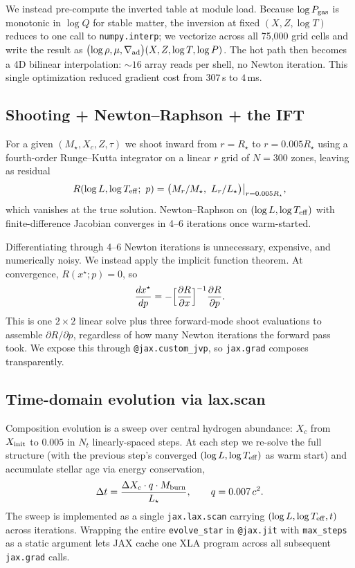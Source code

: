 \documentclass[twocolumn]{aastex631}
\newcommand{\Teff}{\ensuremath{T_{\rm eff}}}
\newcommand{\code}[1]{\texttt{#1}}
\begin{document}
We instead pre-compute the inverted table at module load. Because
$\log P_{\rm gas}$ is monotonic in $\log Q$ for stable matter, the
inversion at fixed $(X, Z, \log T)$ reduces to one call to
\code{numpy.interp}; we vectorize across all 75{,}000 grid cells and
write the result as
$\bigl(\log\rho, \mu, \nabla_{\rm ad}\bigr)(X, Z, \log T, \log P)$.
The hot path then becomes a 4D bilinear interpolation:
$\sim 16$ array reads per shell, no Newton iteration. This single
optimization reduced gradient cost from $307\,$s to $4\,$ms.

\subsection{Shooting + Newton--Raphson + the IFT}

For a given $(M_\star, X_c, Z, \tau)$ we shoot inward from
$r = R_\star$ to $r = 0.005 R_\star$ using a fourth-order Runge--Kutta
integrator on a linear $r$ grid of $N = 300$ zones, leaving as residual
\begin{equation}
R(\log L, \log\Teff;\ p) = \bigl(M_r/M_\star,\ L_r/L_\star\bigr)\big|_{r=0.005 R_\star},
\end{equation}
which vanishes at the true solution. Newton--Raphson on
$(\log L, \log\Teff)$ with finite-difference Jacobian converges in 4--6
iterations once warm-started.

Differentiating through 4--6 Newton iterations is unnecessary, expensive,
and numerically noisy. We instead apply the implicit function theorem.
At convergence, $R(x^\star;p) = 0$, so
\begin{equation}
\frac{dx^\star}{dp} = -\Bigl[\frac{\partial R}{\partial x}\Bigr]^{-1}
\frac{\partial R}{\partial p}.
\end{equation}
This is one $2\times2$ linear solve plus three forward-mode shoot
evaluations to assemble $\partial R/\partial p$, regardless of how
many Newton iterations the forward pass took. We expose this
through \code{@jax.custom\_jvp}, so \code{jax.grad} composes
transparently.

\subsection{Time-domain evolution via lax.scan}

Composition evolution is a sweep over central hydrogen abundance:
$X_c$ from $X_{\rm init}$ to $0.005$ in $N_t$ linearly-spaced steps. At
each step we re-solve the full structure (with the previous step's
converged $(\log L, \log\Teff)$ as warm start) and accumulate stellar
age via energy conservation,
\begin{equation}
\Delta t = \frac{\Delta X_c \cdot q \cdot M_{\rm burn}}{L_\star},\qquad q = 0.007\,c^2.
\end{equation}
The sweep is implemented as a single \code{jax.lax.scan} carrying
$(\log L, \log\Teff, t)$ across iterations. Wrapping the entire
\code{evolve\_star} in \code{@jax.jit} with \code{max\_steps} as a
static argument lets JAX cache one XLA program across all subsequent
\code{jax.grad} calls.
\end{document}
